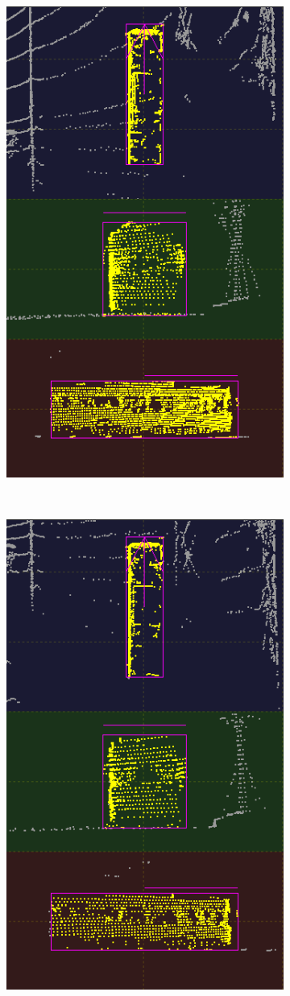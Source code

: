 \documentclass[letterpaper, 10 pt, conference]{ieeeconf}  %
\begin{document}
\begin{figure}[th]
	
	\begin{subfigure}{0.16\linewidth}
		\includegraphics[scale=0.12]{./figures/transfer/bus-ref}
		\caption{}
	\end{subfigure}
	~
	\begin{subfigure}{0.16\linewidth}
		\includegraphics[scale=0.12]{./figures/transfer/bus-1}

\end{subfigure}
\end{figure}
\end{document}
